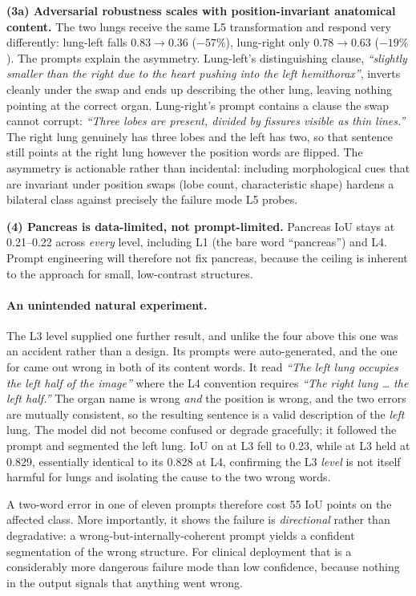 \textbf{(3a) Adversarial robustness scales with position-invariant anatomical
content.} The two lungs receive the same L5 transformation and respond very
differently: lung-left falls $0.83\to0.36$ ($-57\%$), lung-right only
$0.78\to0.63$ ($-19\%$). The prompts explain the asymmetry. Lung-left's
distinguishing clause, \emph{``slightly smaller than the right due to the heart
pushing into the left hemithorax''}, inverts cleanly under the swap and ends up
describing the other lung, leaving nothing pointing at the correct organ.
Lung-right's prompt contains a clause the swap cannot corrupt: \emph{``Three
lobes are present, divided by fissures visible as thin lines.''} The right lung
genuinely has three lobes and the left has two, so that sentence still points at
the right lung however the position words are flipped. The asymmetry is
actionable rather than incidental: including morphological cues that are
invariant under position swaps (lobe count, characteristic shape) hardens a
bilateral class against precisely the failure mode L5 probes.

\textbf{(4) Pancreas is data-limited, not prompt-limited.} Pancreas IoU stays at
0.21--0.22 across \emph{every} level, including L1 (the bare word ``pancreas'')
and L4. Prompt engineering will therefore not fix pancreas, because the ceiling
is inherent to the approach for small, low-contrast structures.

\paragraph{An unintended natural experiment.}
The L3 level supplied one further result, and unlike the four above this one was
an accident rather than a design. Its prompts were auto-generated, and the one
for  came out wrong in both of its content words. It read
\emph{``The left lung occupies the left half of the image''} where the L4
convention requires \emph{``The right lung \ldots{} the left half.''} The organ
name is wrong \emph{and} the position is wrong, and the two errors are mutually
consistent, so the resulting sentence is a valid description of the \emph{left}
lung. The model did not become confused
or degrade gracefully; it followed the prompt and segmented the left lung. IoU
on  at L3 fell to 0.23, while  at L3 held at
0.829, essentially identical to its 0.828 at L4, confirming the L3 \emph{level}
is not itself harmful for lungs and isolating the cause to the two wrong words.

A two-word error in one of eleven prompts therefore cost 55 IoU points on the
affected class. More importantly, it shows the failure is \emph{directional}
rather than degradative: a wrong-but-internally-coherent prompt yields a
confident segmentation of the wrong structure. For clinical deployment that is a
considerably more dangerous failure mode than low confidence, because nothing in
the output signals that anything went wrong.

